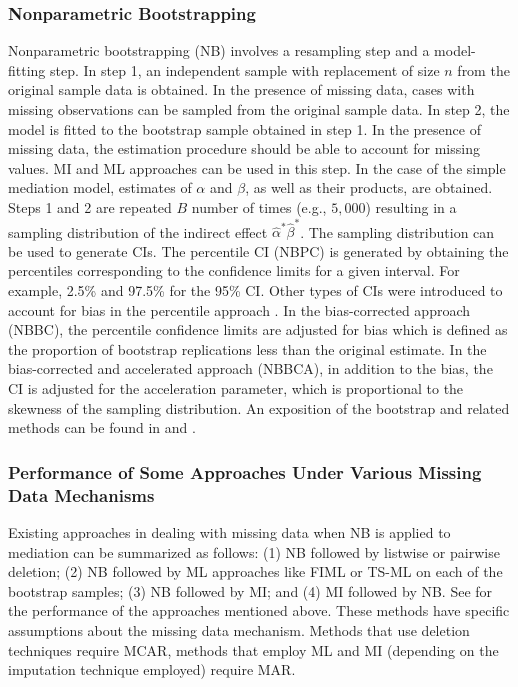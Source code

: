 \documentclass[man]{apa7}\usepackage[]{graphicx}\usepackage[]{xcolor}
\begin{document}
\subsubsection{Nonparametric Bootstrapping}

Nonparametric bootstrapping (NB) involves a resampling step
and a model-fitting step.
In step 1,
an independent sample with replacement of size ${n}$
from the original sample data is obtained.
In the presence of missing data,
cases with missing observations
can be sampled from the original sample data.
In step 2,
the model is fitted to the bootstrap sample obtained in step 1.
In the presence of missing data,
the estimation procedure should be able to account for missing values.
MI and ML approaches can be used in this step.
In the case of the simple mediation model,
estimates of ${\alpha}$ and ${\beta}$,
as well as their products,
are obtained.
Steps 1 and 2 are repeated $B$ number of times (e.g., ${5,000}$)
resulting in a sampling distribution
of the indirect effect ${\hat{\alpha}}^{\ast}{\hat{\beta}}^{\ast}$.
The sampling distribution can be used to generate CIs.
The percentile CI (NBPC)
is generated by obtaining the percentiles
corresponding to the confidence limits for a given interval.
For example,
2.5\% and 97.5\% for the 95\% CI.
Other types of CIs were introduced
to account for bias in the percentile approach
\parencite{Lib-Bootstrap-Efron-1987,
Lib-Bootstrap-Efron-1988}.
In the bias-corrected approach (NBBC),
the percentile confidence limits are adjusted for bias
which is defined as the proportion of bootstrap replications
less than the original estimate.
In the bias-corrected and accelerated approach (NBBCA),
in addition to the bias,
the CI is adjusted for the acceleration parameter,
which is proportional to the skewness of the sampling distribution.
An exposition of the bootstrap and related methods
can be found in
\Textcite{Lib-Bootstrap-Books-Efron-1993}
and
\Textcite{Lib-Bootstrap-Books-Davison-1997}.

\subsubsection{Performance of Some Approaches Under Various Missing Data Mechanisms}

Existing approaches in dealing with missing data when NB is applied to mediation
can be summarized as follows:
(1) NB followed by listwise or pairwise deletion;
(2) NB followed by ML approaches like FIML or TS-ML
on each of the bootstrap samples;
(3) NB followed by MI;
and (4) MI followed by NB.
See
\Textcite{Lib-Mediation-Missing-Data-Zhang-2012,
	Lib-Mediation-Missing-Data-Wu-2013,
Lib-Mediation-Missing-Data-Zhang-2015}
for the performance of the approaches mentioned above.
These methods have specific assumptions about the missing data mechanism.
Methods that use deletion techniques require MCAR,
methods that employ ML and MI
(depending on the imputation technique employed) require MAR.
\end{document}
